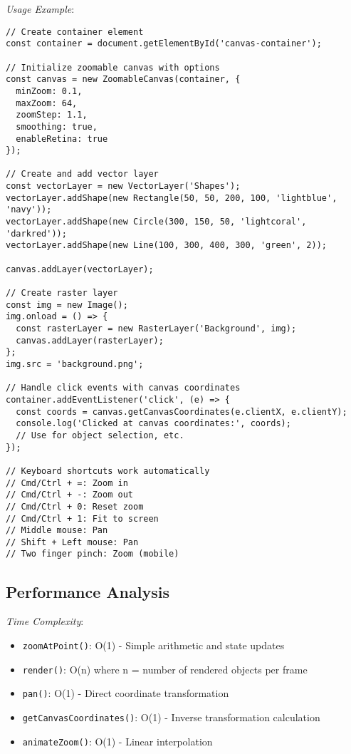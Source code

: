 \documentclass[11pt]{article}
\begin{document}
\emph{Usage Example}:

\begin{verbatim}
// Create container element
const container = document.getElementById('canvas-container');

// Initialize zoomable canvas with options
const canvas = new ZoomableCanvas(container, {
  minZoom: 0.1,
  maxZoom: 64,
  zoomStep: 1.1,
  smoothing: true,
  enableRetina: true
});

// Create and add vector layer
const vectorLayer = new VectorLayer('Shapes');
vectorLayer.addShape(new Rectangle(50, 50, 200, 100, 'lightblue', 'navy'));
vectorLayer.addShape(new Circle(300, 150, 50, 'lightcoral', 'darkred'));
vectorLayer.addShape(new Line(100, 300, 400, 300, 'green', 2));

canvas.addLayer(vectorLayer);

// Create raster layer
const img = new Image();
img.onload = () => {
  const rasterLayer = new RasterLayer('Background', img);
  canvas.addLayer(rasterLayer);
};
img.src = 'background.png';

// Handle click events with canvas coordinates
container.addEventListener('click', (e) => {
  const coords = canvas.getCanvasCoordinates(e.clientX, e.clientY);
  console.log('Clicked at canvas coordinates:', coords);
  // Use for object selection, etc.
});

// Keyboard shortcuts work automatically
// Cmd/Ctrl + =: Zoom in
// Cmd/Ctrl + -: Zoom out
// Cmd/Ctrl + 0: Reset zoom
// Cmd/Ctrl + 1: Fit to screen
// Middle mouse: Pan
// Shift + Left mouse: Pan
// Two finger pinch: Zoom (mobile)
\end{verbatim}
\subsection{Performance Analysis}
\label{sec:org057086f}

\emph{Time Complexity}:

\begin{itemize}
\item \texttt{zoomAtPoint()}: O(1) - Simple arithmetic and state updates
\item \texttt{render()}: O(n) where n = number of rendered objects per frame
\item \texttt{pan()}: O(1) - Direct coordinate transformation
\item \texttt{getCanvasCoordinates()}: O(1) - Inverse transformation calculation
\item \texttt{animateZoom()}: O(1) - Linear interpolation
\end{itemize}
\end{document}
